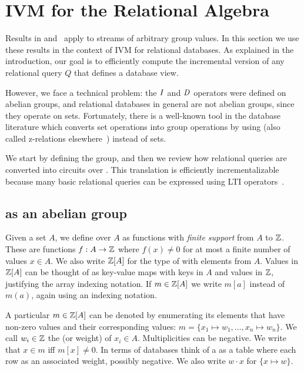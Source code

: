 \section{IVM for the Relational Algebra}\label{sec:relational}

Results in  and~
apply to streams of arbitrary group values.  In this
section we use these results in the context of IVM for
relational databases.  As explained in the introduction, our goal is to
efficiently compute the incremental version of any relational query $Q$
that defines a database view.

However, we face a technical problem: the $\mathit{I}$ and $\mathit{D}$ operators were
defined on abelian groups, and relational databases in general are
not abelian groups, since they operate on sets.  Fortunately,
there is a well-known tool in the database literature
which converts set operations into group operations by using \zrs
(also called z-relations elsewhere~\cite{green-tcs11}) instead of sets.

We start by defining the \zrs group, and then we review how
relational queries are converted into \dbsp circuits  over \zrs.
This translation is efficiently incrementalizable because
many basic relational queries can be expressed using LTI \zr operators~.

\subsection{\zrs as an abelian group}

Given a set $A$, we define 
over $A$ as functions with \emph{finite support} from $A$ to $\mathbb{Z}$.
These are functions $f: A \rightarrow \mathbb{Z}$ where
$f(x) \not= 0$ for at most a finite number of values $x \in A$.
We also write $\mathbb{Z}[A]$ for the type of \zrs with elements from $A$.
Values in $\mathbb{Z}[A]$ can be thought of as key-value maps with
keys in $A$ and values in $\mathbb{Z}$, justifying the array indexing notation.
If $m \in \mathbb{Z}[A]$ we write $m[a]$ instead of $m(a)$, again using
an indexing notation.

A particular \zr $m \in \mathbb{Z}[A]$ can be denoted by enumerating its
elements that have non-zero values and their corresponding values:
$m = \{ x_1 \mapsto w_1, \dots, x_n \mapsto w_n \}$.
We call $w_i \in \mathbb{Z}$ the  (or weight)
of $x_i \in A$.  Multiplicities can be negative.
We write that $x \in m$ iff $m[x] \not= 0$.
In terms of databases think of a \zr as a table
where each row as an associated weight, possibly negative.
We also write $w \cdot x$ for $\{ x \mapsto w \}$.

